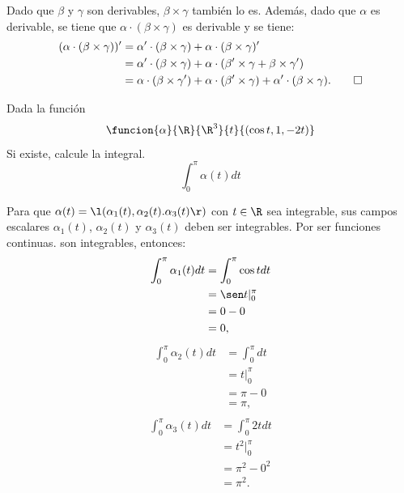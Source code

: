 \documentclass[a4,11pt]{aleph-examen}
\begin{document}
\begin{preguntas}
\begin{respuesta}
    Dado que $\beta$ y $\gamma$ son derivables, $\beta\times \gamma$ también lo es. Además, dado que $\alpha$ es derivable, se tiene que $\alpha \cdot (\beta \times \gamma)$ es derivable y se tiene:
    \begin{align*}
        (\alpha \cdot (\beta \times \gamma))' 
            &= \alpha' \cdot( \beta \times \gamma) + \alpha \cdot (\beta \times \gamma)'\\
            &= \alpha' \cdot (\beta \times \gamma) + \alpha \cdot (\beta' \times \gamma + \beta \times \gamma')\\
            &= \alpha \cdot (\beta \times \gamma') + \alpha \cdot (\beta' \times \gamma) + \alpha' \cdot (\beta \times \gamma).\qedhere
    \end{align*}
\end{respuesta}

\item
    Dada la función
    \[
        \funcion{\alpha}{\R}{\R^3}{t}{(\cos t , 1, -2t)}
    \]
    Si existe, calcule la integral.
    \[
        \int_0^{\pi} \alpha(t) dt
    \]
\begin{respuesta}
    Para que $\alpha(t)=\l(\alpha_1(t),\alpha_2(t).\alpha_3(t)\r)$ con $t \in \R$ sea integrable, sus campos escalares $\alpha_1(t)$, $\alpha_2(t)$ y $\alpha_3(t)$ deben ser integrables. Por ser funciones continuas. son integrables, entonces:
    \[
    \begin{aligned}
        \int_0^{\pi} \alpha_1(t) dt &= \int_0^{\pi} \cos t dt\\
        &= \sen t |_0^{\pi}\\
        &= 0-0\\
        &=0,\\
    \end{aligned}
    \]
    \[
    \begin{aligned}
        \int_0^{\pi} \alpha_2(t) dt &= \int_0^{\pi} dt\\
        &= t |_0^{\pi}\\
        &= \pi-0\\
        &=\pi,\\
    \end{aligned}
    \]
    \[
    \begin{aligned}
        \int_0^{\pi} \alpha_3(t) dt &= \int_0^{\pi} 2t dt\\
        &= t^2 |_0^{\pi}\\
        &= \pi^2-0^2\\
        &=\pi^2.\\
    \end{aligned}
    \]
    

\end{respuesta}
\end{preguntas}
\end{document}
